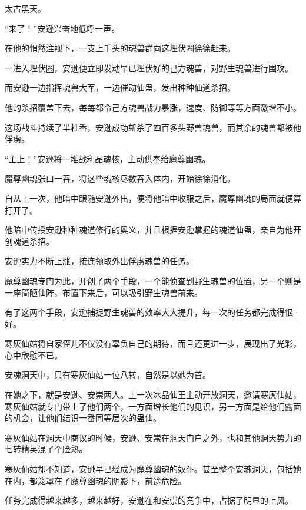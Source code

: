 
\begin{this_body}



太古黑天。

“来了！”安逊兴奋地低呼一声。

在他的悄然注视下，一支上千头的魂兽群向这埋伏圈徐徐赶来。

一进入埋伏圈，安逊便立即发动早已埋伏好的己方魂兽，对野生魂兽进行围攻。

而安逊一边指挥魂兽大军，一边催动仙蛊，发出种种仙道杀招。

他的杀招覆盖下去，每每都令己方魂兽战力暴涨，速度、防御等等方面激增不小。

这场战斗持续了半柱香，安逊成功斩杀了四百多头野兽魂兽，而其余的魂兽都被他俘虏。

“主上！”安逊将一堆战利品魂核，主动供奉给魔尊幽魂。

魔尊幽魂张口一吞，将这些魂核尽数吞入体内，开始徐徐消化。

自从上一次，他暗中跟随安逊外出，便将他暗中收服之后，魔尊幽魂的局面就便算打开了。

他暗中传授安逊种种魂道修行的奥义，并且根据安逊掌握的魂道仙蛊，亲自为他开创魂道杀招。

安逊实力不断上涨，接连领取外出俘虏魂兽的任务。

魔尊幽魂专门为此，开创了两个手段，一个能侦查到野生魂兽的位置，另一个则是一座简陋仙阵，布置下来后，可以吸引野生魂兽前来。

有了这两个手段，安逊捕捉野生魂兽的效率大大提升，每一次的任务都完成得很好。

寒灰仙姑将自家侄儿不仅没有辜负自己的期待，而且还更进一步，展现出了光彩，心中欣慰不已。

安魂洞天中，只有寒灰仙姑一位八转，自然是以她为首。

在她之下，就是安逊、安崇两人。上一次冰晶仙王主动开放洞天，邀请寒灰仙姑，寒灰仙姑就专门带上了他们两个，一方面增长他们的见识，另一方面是给他们露面的机会，让他们结识一番同等层次的蛊仙。

寒灰仙姑在洞天中商议的时候，安逊、安崇在洞天门户之外，也和其他洞天势力的七转精英混了个脸熟。

寒灰仙姑却不知道，安逊早已经成为魔尊幽魂的奴仆。甚至整个安魂洞天，包括她在内，都笼罩在了魔尊幽魂的阴影下，前途危险。

任务完成得越来越多，越来越好，安逊在和安崇的竞争中，占据了明显的上风。


\end{this_body}
